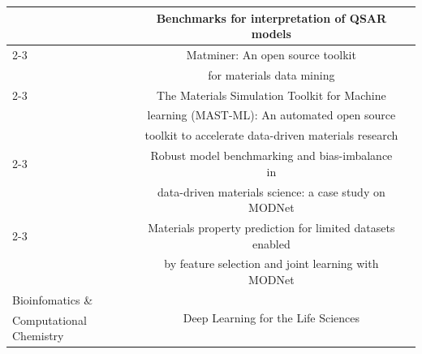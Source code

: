 \begin{table}[ht]
\begin{tabular}{lcc}
 & Benchmarks for interpretation of QSAR models & \citet{Matveieva2021} \\
\cmidrule(lr){2-3}

 & Matminer: An open source toolkit & \multirow{2}{*}{\citet{WARD201860}} \\
 & for materials data mining & \\
\cmidrule(lr){2-3}

 & The Materials Simulation Toolkit for Machine  & \multirow{3}{*}{\citet{JACOBS2020109544}} \\
 & learning (MAST-ML): An automated open source & \\
 & toolkit to accelerate data-driven materials research & \\
\cmidrule(lr){2-3}

 & Robust model benchmarking and bias-imbalance in & \multirow{2}{*}{\citet{DeBreuck2021b}} \\
 & data-driven materials science: a case study on MODNet & \\
\cmidrule(lr){2-3}

 & Materials property prediction for limited datasets enabled & \multirow{2}{*}{\citet{DeBreuck2021}} \\
 & by feature selection and joint learning with MODNet & \\

\midrule

Bioinfomatics \&  & \multirow{2}{*}{Deep Learning for the Life Sciences} & \multirow{2}{*}{\citet{Ramsundar-et-al-2019}} \\
Computational Chemistry & & \\

\bottomrule
\end{tabular}
\vspace{-11pt}
\label{tab:pubs_biochem}
\end{table}

